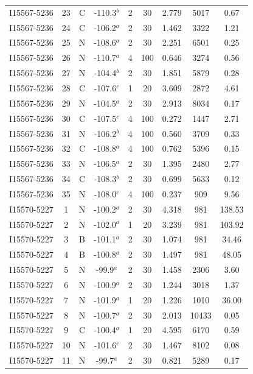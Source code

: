 \begin{table}
\begin{tabular}{ccccccccc}
I15567-5236 & 23 & C & -110.3$^{b}$ & 2 & 30 & 2.779 & 5017 & 0.67 \\
I15567-5236 & 24 & C & -106.2$^{a}$ & 2 & 30 & 1.462 & 3322 & 1.21 \\
I15567-5236 & 25 & N & -108.6$^{a}$ & 2 & 30 & 2.251 & 6501 & 0.25 \\
I15567-5236 & 26 & N & -110.7$^{a}$ & 4 & 100 & 0.646 & 3274 & 0.56 \\
I15567-5236 & 27 & N & -104.4$^{b}$ & 2 & 30 & 1.851 & 5879 & 0.28 \\
I15567-5236 & 28 & C & -107.6$^{c}$ & 1 & 20 & 3.609 & 2872 & 4.61 \\
I15567-5236 & 29 & N & -104.5$^{a}$ & 2 & 30 & 2.913 & 8034 & 0.17 \\
I15567-5236 & 30 & C & -107.5$^{c}$ & 4 & 100 & 0.272 & 1447 & 2.71 \\
I15567-5236 & 31 & N & -106.2$^{b}$ & 4 & 100 & 0.560 & 3709 & 0.33 \\
I15567-5236 & 32 & C & -108.8$^{a}$ & 4 & 100 & 0.762 & 5396 & 0.15 \\
I15567-5236 & 33 & N & -106.5$^{a}$ & 2 & 30 & 1.395 & 2480 & 2.77 \\
I15567-5236 & 34 & C & -108.3$^{b}$ & 2 & 30 & 0.699 & 5633 & 0.12 \\
I15567-5236 & 35 & N & -108.0$^{c}$ & 4 & 100 & 0.237 & 909 & 9.56 \\
I15570-5227 & 1 & N & -100.2$^{a}$ & 2 & 30 & 4.318 & 981 & 138.53 \\
I15570-5227 & 2 & N & -102.0$^{a}$ & 1 & 20 & 3.239 & 981 & 103.92 \\
I15570-5227 & 3 & B & -101.1$^{a}$ & 2 & 30 & 1.074 & 981 & 34.46 \\
I15570-5227 & 4 & B & -100.8$^{a}$ & 2 & 30 & 1.497 & 981 & 48.05 \\
I15570-5227 & 5 & N & -99.9$^{a}$ & 2 & 30 & 1.458 & 2306 & 3.60 \\
I15570-5227 & 6 & N & -100.9$^{a}$ & 2 & 30 & 1.244 & 3018 & 1.37 \\
I15570-5227 & 7 & N & -101.9$^{a}$ & 1 & 20 & 1.226 & 1010 & 36.00 \\
I15570-5227 & 8 & N & -100.7$^{a}$ & 2 & 30 & 2.013 & 10433 & 0.05 \\
I15570-5227 & 9 & C & -100.4$^{a}$ & 1 & 20 & 4.595 & 6170 & 0.59 \\
I15570-5227 & 10 & N & -101.6$^{c}$ & 2 & 30 & 1.467 & 8102 & 0.08 \\
I15570-5227 & 11 & N & -99.7$^{a}$ & 2 & 30 & 0.821 & 5289 & 0.17 \\

\end{tabular}
\end{table}
